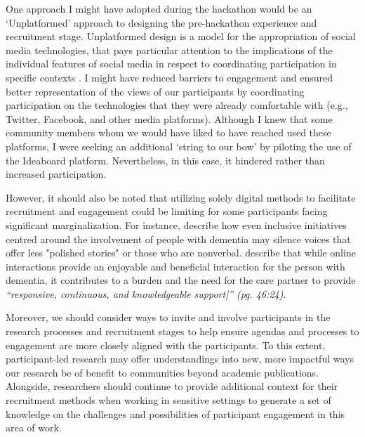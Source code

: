 One approach I might have adopted during the hackathon would be an ‘Unplatformed’ approach to designing the pre-hackathon experience and recruitment stage. Unplatformed design is a model for the appropriation of social media technologies, that pays particular attention to the implications of the individual features of social media in respect to coordinating participation in specific contexts \citep{lambton-howard_unplatformed_2020}. I might have reduced barriers to engagement and ensured better representation of the views of our participants by coordinating participation on the technologies that they were already comfortable with (e.g., Twitter, Facebook, and other media platforms). Although I knew that some community members whom we would have liked to have reached used these platforms, I were seeking an additional ‘string to our bow’ by piloting the use of the Ideaboard platform. Nevertheless, in this case, it hindered rather than increased participation. 

However, it should also be noted that utilizing solely digital methods to facilitate recruitment and engagement could be limiting for some participants facing significant marginalization. For instance, \citep{lazar_safe_2019} describe how even inclusive initiatives centred around the involvement of people with dementia may silence voices that offer less "polished stories" or those who are nonverbal. \cite{dai2020making} describe that while online interactions provide an enjoyable and beneficial interaction for the person with dementia, it contributes to a burden and the need for the care partner to provide \textit{“responsive, continuous, and knowledgeable support|” (pg. 46:24)\citep{hwang2020exploring}}. 

Moreover, we should consider ways to invite and involve participants in the research processes and recruitment stages to help ensure agendas and processes to engagement are more closely aligned with the participants. To this extent, participant-led research may offer understandings into new, more impactful ways our research be of benefit to communities beyond academic publications. Alongside, researchers should continue to provide additional context for their recruitment methods when working in sensitive settings to generate a set of knowledge on the challenges and possibilities of participant engagement in this area of work.



